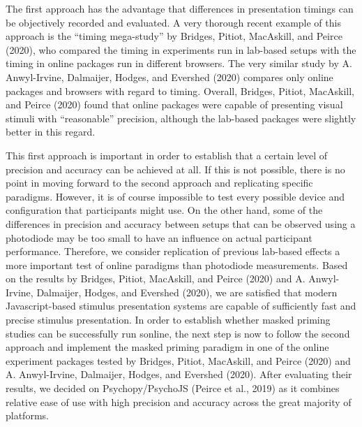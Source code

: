 \documentclass[
  english,
  man]{apa6}
\begin{document}
The first approach has the advantage that differences in presentation timings can be objectively recorded and evaluated. A very thorough recent example of this approach is the ``timing mega-study'' by Bridges, Pitiot, MacAskill, and Peirce (2020), who compared the timing in experiments run in lab-based setups with the timing in online packages run in different browsers. The very similar study by A. Anwyl-Irvine, Dalmaijer, Hodges, and Evershed (2020) compares only online packages and browsers with regard to timing. Overall, Bridges, Pitiot, MacAskill, and Peirce (2020) found that online packages were capable of presenting visual stimuli with ``reasonable'' precision, although the lab-based packages were slightly better in this regard.

This first approach is important in order to establish that a certain level of precision and accuracy can be achieved at all. If this is not possible, there is no point in moving forward to the second approach and replicating specific paradigms. However, it is of course impossible to test every possible device and configuration that participants might use. On the other hand, some of the differences in precision and accuracy between setups that can be observed using a photodiode may be too small to have an influence on actual participant performance. Therefore, we consider replication of previous lab-based effects a more important test of online paradigms than photodiode measurements. Based on the results by Bridges, Pitiot, MacAskill, and Peirce (2020) and A. Anwyl-Irvine, Dalmaijer, Hodges, and Evershed (2020), we are satisfied that modern Javascript-based stimulus presentation systems are capable of sufficiently fast and precise stimulus presentation. In order to establish whether masked priming studies can be successfully run sonline, the next step is now to follow the second approach and implement the masked priming paradigm in one of the online experiment packages tested by Bridges, Pitiot, MacAskill, and Peirce (2020) and A. Anwyl-Irvine, Dalmaijer, Hodges, and Evershed (2020). After evaluating their results, we decided on Psychopy/PsychoJS (Peirce et al., 2019) as it combines relative ease of use with high precision and accuracy across the great majority of platforms.
\end{document}
